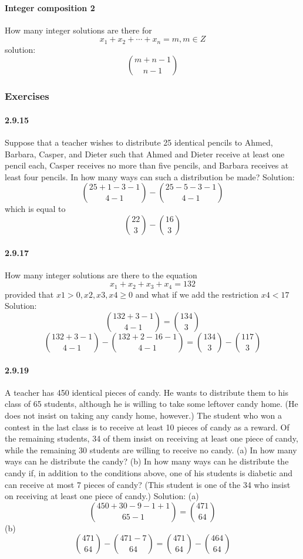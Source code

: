 \documentclass{article}
\begin{document}
\paragraph{Integer composition 2}
How many integer solutions are there for$$x_1+x_2+\cdots+x_n=m, m\in Z$$
solution:\newline
$$\binom{m+n-1}{n-1}$$
\subsubsection{Exercises}
\paragraph{2.9.15}
Suppose that a teacher wishes to distribute 25 identical pencils to Ahmed, Barbara,
Casper, and Dieter such that Ahmed and Dieter receive at least one pencil each, Casper
receives no more than five pencils, and Barbara receives at least four pencils. In how
many ways can such a distribution be made?\newline
Solution:\newline
$$\binom{25+1-3-1}{4-1}-\binom{25-5-3-1}{4-1}$$ which is equal to
$$\binom{22}{3}-\binom{16}{3}$$
\paragraph{2.9.17}
How many integer solutions are there to the equation
$$x_1+x_2+x_3+x_4=132$$
provided that $x1>0, x2,x3,x4\ge 0$ and what if we add the restriction $x4<17$\newline
Solution:\newline
$$\binom{132+3-1}{4-1}=\binom{134}{3}$$
$$\binom{132+3-1}{4-1}-\binom{132+2-16-1}{4-1}=\binom{134}{3}-\binom{117}{3}$$
\paragraph{2.9.19}
A teacher has 450 identical pieces of candy. He wants to distribute them to his class
of 65 students, although he is willing to take some leftover candy home. (He does not
insist on taking any candy home, however.) The student who won a contest in the last
class is to receive at least 10 pieces of candy as a reward. Of the remaining students, 34
of them insist on receiving at least one piece of candy, while the remaining 30 students
are willing to receive no candy.\newline
(a) In how many ways can he distribute the candy?\newline
(b) In how many ways can he distribute the candy if, in addition to the conditions
above, one of his students is diabetic and can receive at most 7 pieces of candy?
(This student is one of the 34 who insist on receiving at least one piece of candy.)\newline
Solution:\newline
(a) $$\binom{450+30-9-1+1}{65-1}=\binom{471}{64}$$
(b)$$\binom{471}{64}-\binom{471-7}{64}=\binom{471}{64}-\binom{464}{64}$$
\end{document}
